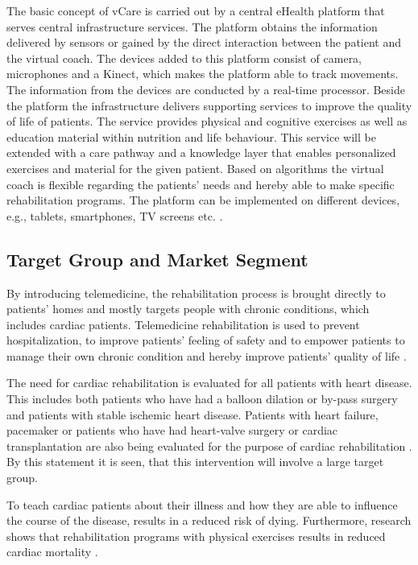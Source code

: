 The basic concept of vCare is carried out by a central eHealth platform that serves central infrastructure services. The platform obtains the information delivered by sensors or gained by the direct interaction between the patient and the virtual coach. The devices added to this platform consist of camera, microphones and a Kinect, which makes the platform able to track movements. The information from the devices are conducted by a real-time processor. Beside the platform the infrastructure delivers supporting services to improve the quality of life of patients. The service provides physical and cognitive exercises as well as education material within nutrition and life behaviour. This service will be extended with a care pathway and a knowledge layer that enables personalized exercises and material for the given patient. Based on algorithms the virtual coach is flexible regarding the patients’ needs and hereby able to make specific rehabilitation programs. The platform can be implemented on different devices, e.g., tablets, smartphones, TV screens etc. \cite{Technical}. 


\subsection{Target Group and Market Segment}

By introducing telemedicine, the rehabilitation process is brought directly to patients' homes and mostly targets people with chronic conditions, which includes cardiac patients. Telemedicine rehabilitation is used to prevent hospitalization, to improve patients' feeling of safety and to empower patients to manage their own chronic condition and hereby improve patients' quality of life \cite{Emergence}. 

The need for cardiac rehabilitation is evaluated for all patients with heart disease. This includes both patients who have had a balloon dilation or by-pass surgery and patients with stable ischemic heart disease.
Patients with heart failure, pacemaker or patients who have had heart-valve surgery or cardiac transplantation are also being evaluated for the purpose of cardiac rehabilitation \cite{Rehabilitering}. By this statement it is seen, that this intervention will involve a large target group.

To teach cardiac patients about their illness and how they are able to influence the course of the disease, results in a reduced risk of dying. Furthermore, research shows that rehabilitation programs with physical exercises results in reduced cardiac mortality \cite{Hjerteforening}.    
   
